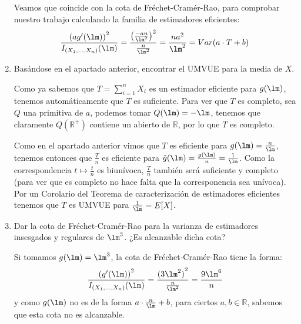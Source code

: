 \begin{ejercicio}
\begin{enumerate}[label=\alph*)]
\begin{equation*}
            \end{equation*}
            Veamos que coincide con la cota de Fréchet-Cramér-Rao, para comprobar nuestro trabajo calculando la familia de estimadores eficientes:
            \begin{equation*}
                \dfrac{{(ag'(\lm))}^{2}}{I_{(X_1,\ldots,X_n)}(\lm)} = \dfrac{{\left(\frac{-an}{\lm^2}\right)}^{2}}{\frac{n}{\lm^2}} = \frac{na^2}{\lm^2} = Var(a\cdot T+b)
            \end{equation*}
        \item Basándose en el apartado anterior, encontrar el UMVUE para la media de $X$.

            Como ya sabemos que $T=\sum\limits_{i=1}^{n}X_i$ es un estimador eficiente para $g(\lm)$, tenemos automáticamente que $T$ es suficiente. Para ver que $T$ es completo, sea $Q$ una primitiva de $a$, podemos tomar $Q(\lm) = -\lm$, tenemos que claramente $Q(\mathbb{R}^+)$ contiene un abierto de $\mathbb{R}$, por lo que $T$ es completo. 

            Como en el apartado anterior vimos que $T$ es eficiente para $g(\lm) = \frac{n}{\lm}$, tenemos entonces que $\frac{T}{n}$ es eficiente para $\tilde{g}(\lm) = \frac{g(\lm)}{n} = \frac{1}{\lm}$. Como la correspondencia $t \mapsto \frac{t}{n}$ es biunívoca, $\frac{T}{n}$ también será suficiente y completo (para ver que es completo no hace falta que la corresponencia sea unívoca). Por un Corolario del Teorema de caracterización de estimadores eficientes tenemos que $T$ es UMVUE para $\frac{1}{\lm} = E[X]$.

        \item Dar la cota de Fréchet-Cramér-Rao para la varianza de estimadores insesgados y regulares de $\lm^3$. ¿Es alcanzable dicha cota?

            Si tomamos $g(\lm) = \lm^3$, la cota de Fréchet-Cramér-Rao tiene la forma:
            \begin{equation*}
                \frac{{(g'(\lm))}^{2}}{I_{(X_1,\ldots,X_n)}(\lm)} = \frac{{(3\lm^2)}^{2}}{\frac{n}{\lm^2}} = \dfrac{9\lm^6}{n}
            \end{equation*}
            y como $g(\lm)$ no es de la forma $a\cdot \frac{n}{\lm}+b$, para ciertos $a,b\in \mathbb{R}$, sabemos que esta cota no es alcanzable.
    \end{enumerate}
\end{ejercicio}

